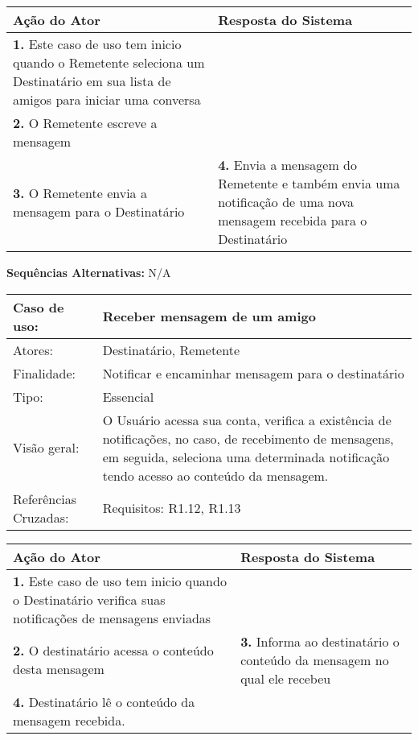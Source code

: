 \documentclass[12pt,a4paper,onecolumn,titlepage]{article}
\begin{document}
\begin{center}
\def\arraystretch{1.1}
\begin{tabular}{|p{6cm}|p{6cm}|}

\hline
\textbf{Ação do Ator} & \textbf{Resposta do Sistema} \\ \hline
\textbf{1.} Este caso de uso tem inicio quando o Remetente seleciona um Destinatário em sua lista de amigos para iniciar uma conversa  &  \\ \hline
\textbf{2.} O Remetente escreve a mensagem  &   \\ \hline
\textbf{3.} O Remetente envia a mensagem para o Destinatário  &
\textbf{4.} Envia a mensagem do Remetente e também envia uma notificação de uma nova mensagem recebida para o Destinatário \\ \hline
\end{tabular}
\end{center}

\textbf{Sequências Alternativas:} N/A

\newpage

\begin{table}[h!]
\begin{center}
\begin{tabular}{p{2.5cm} p{9.5cm}}
Caso de uso: & \textbf{Receber mensagem de um amigo} \\ \hline
Atores: & Destinatário, Remetente \\ \hline
Finalidade: & Notificar e encaminhar mensagem para o destinatário\\ \hline
Tipo: & Essencial \\ \hline
Visão geral: & O Usuário acessa sua conta, verifica a existência de notificações, no caso, de recebimento de mensagens, em seguida, seleciona uma determinada notificação tendo acesso ao conteúdo da mensagem. \\ \hline
Referências Cruzadas: & Requisitos: R1.12, R1.13\\

\end{tabular}
\end{center}
\end{table} 

\begin{center}
\def\arraystretch{1.1}
\begin{tabular}{|p{6cm}|p{6cm}|}

\hline
\textbf{Ação do Ator} & \textbf{Resposta do Sistema} \\ \hline
\textbf{1.} Este caso de uso tem inicio quando o Destinatário verifica suas notificações de mensagens enviadas  &  \\ \hline
\textbf{2.} O destinatário acessa o conteúdo desta mensagem  & 
\textbf{3.} Informa ao destinatário o conteúdo da mensagem no qual ele recebeu \\ \hline
\textbf{4.} Destinatário lê o conteúdo da mensagem recebida. & \\ \hline
\end{tabular}
\end{center}
\end{document}
